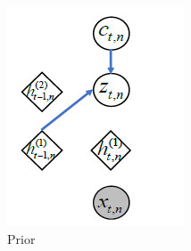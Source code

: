 \documentclass[letterpaper,12pt]{article}
\begin{document}
		\begin{figure}[htbp] 
			\centering 
			
			\begin{subfigure}{0.19\textwidth}
				\includegraphics[width=\linewidth]{Switching/Prior}
				\captionsetup{font=scriptsize}
				\caption{Prior}
				\label{fig: Prior}
			\end{subfigure}
			\begin{subfigure}{0.19\textwidth}

\end{subfigure}
\end{figure}
\end{document}
